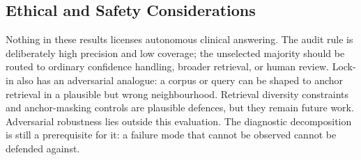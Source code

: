\subsection{Ethical and Safety Considerations}
\label{sec:ethics}

Nothing in these results licenses autonomous clinical answering. The
audit rule is deliberately high precision and low coverage; the unselected
majority should be routed to ordinary confidence handling, broader retrieval,
or human review. Lock-in also has an adversarial analogue: a corpus or query
can be shaped to anchor retrieval in a plausible but wrong neighbourhood.
Retrieval diversity constraints and anchor-masking controls are plausible
defences, but they remain future work.
Adversarial robustness lies outside this evaluation. The diagnostic
decomposition is still a prerequisite for it: a failure mode that cannot be
observed cannot be defended against.

